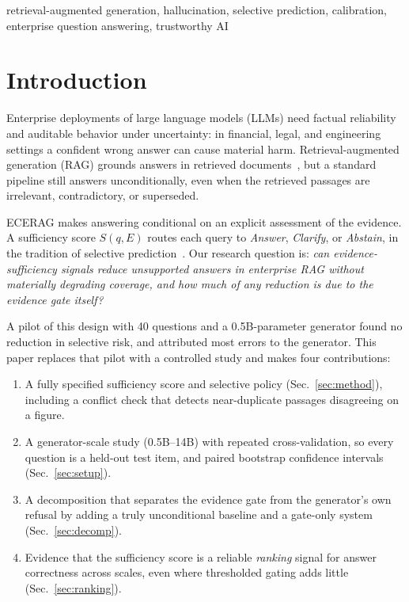 \documentclass[conference,letterpaper]{IEEEtran}
\begin{document}
\begin{IEEEkeywords}
retrieval-augmented generation, hallucination, selective prediction, calibration,
enterprise question answering, trustworthy AI
\end{IEEEkeywords}

\section{Introduction}
Enterprise deployments of large language models (LLMs) need factual reliability and auditable
behavior under uncertainty: in financial, legal, and engineering settings a confident wrong
answer can cause material harm. Retrieval-augmented generation (RAG) grounds answers in retrieved
documents~\cite{lewis2020rag,gao2023survey}, but a standard pipeline still answers
unconditionally, even when the retrieved passages are irrelevant, contradictory, or superseded.

ECERAG makes answering conditional on an explicit assessment of the evidence. A sufficiency score
$S(q,E)$ routes each query to \emph{Answer}, \emph{Clarify}, or \emph{Abstain}, in the tradition of
selective prediction~\cite{geifman2019selectivenet,kamath2020selective}. Our research question is:
\emph{can evidence-sufficiency signals reduce unsupported answers in enterprise RAG without
materially degrading coverage, and how much of any reduction is due to the evidence gate itself?}

A pilot of this design with 40 questions and a 0.5B-parameter generator found no reduction in
selective risk, and attributed most errors to the generator. This paper replaces that pilot with a
controlled study and makes four contributions:
\begin{enumerate}
\item A fully specified sufficiency score and selective policy (Sec.~\ref{sec:method}), including
a conflict check that detects near-duplicate passages disagreeing on a figure.
\item A generator-scale study (0.5B--14B) with repeated cross-validation, so every question is a
held-out test item, and paired bootstrap confidence intervals (Sec.~\ref{sec:setup}).
\item A decomposition that separates the evidence gate from the generator's own refusal by adding
a truly unconditional baseline and a gate-only system (Sec.~\ref{sec:decomp}).
\item Evidence that the sufficiency score is a reliable \emph{ranking} signal for answer
correctness across scales, even where thresholded gating adds little (Sec.~\ref{sec:ranking}).
\end{enumerate}
\end{document}
